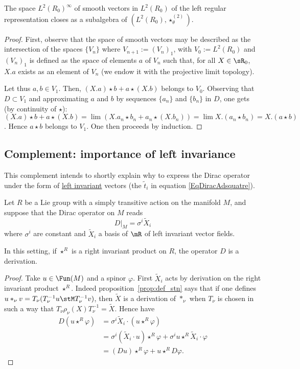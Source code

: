 \begin{proposition}
The space $L^2(R_0)^{\infty}$ of smooth vectors in $L^2(R_0)$ of the left regular representation closes as a subalgebra of $(L^2(R_0),\star^{(2)}_\theta)$.
\end{proposition}

\begin{proof}
First, observe that the space of smooth vectors may be described  as the intersection of the spaces $\{V_n\}$ where  $V_{n+1}:=(V_n)_1$,   with $V_0:=L^2(R_0)$ and $(V_n)_1$ is defined as the space of elements $a$ of $V_n$ such that, for all $X\in\sR_0$, $X.a$ exists as an element of $V_n$ (we endow it with the projective limit topology).                             %

Let thus $a,b\in V_1$. Then, $(X.a)\star b+a\star(X.b)$ belongs to $V_0$.  Observing that $D \subset V_1$ and approximating $a$ and $b$ by sequences $\{a_n\}$ and $\{b_n\}$ in $D $, one gets (by continuity of $\star$): $(X.a)\star b+a\star(X.b)=\lim(X.a_n\star b_n+a_n\star(X.b_n))= \lim X.(a_n\star b_n)=X.(a\star b)$. Hence $a\star b$ belongs to $V_1$.  One then proceeds by induction.
\end{proof}

\subsection{Complement: importance of left invariance}
\label{subsecImpLeftInvarDstar}

This complement intends to shortly explain why to express the Dirac operator under the form of \hyperlink{HyperDefLeftInvar}{left invariant} vectors (the $\tilde t_i$ in equation \eqref{EqDiracAdsquatre}).

Let $R$ be a Lie group with a simply transitive action on the manifold $M$, and suppose that the Dirac operator on $M$ reads
\[
  D|_M=\sigma^i\tilde X_i
\]
where $\sigma^i$ are constant and $\tilde X_i$ a basis of $\mR$ of left invariant vector fields.

\begin{proposition}
In this setting, if $\star^R$ is a right invariant product on $R$, the operator $D$ is a derivation.
\end{proposition}

\begin{proof}
    Take $u\in\Fun(M)$ and a spinor $\varphi$. First $\tilde X_i$ acts by derivation on the right invariant product $\star^R$. Indeed proposition~\ref{prop:def_stn} says that if one defines $u\ast_{\nu} v=T_{\nu}(T_{\nu}^{-1}u\stM T_{\nu}^{-1}v)$, then $\tilde X$ is a derivation of $\ast_{\nu}$ when $T_{\nu}$ is chosen in such a way that $T_{\nu}\rho_{\nu}(X)T_{\nu}^{-1}=\tilde X$. Hence have
\[
\begin{split}
D(u\star^R\varphi)&=\sigma^i\tilde X_i\cdot(u\star^R\varphi)\\
        &=\sigma^i(\tilde X_i\cdot u)\star^R\varphi+\sigma^i u\star^R\tilde X_i\cdot \varphi\\
        &=(Du)\star^R\varphi+u\star^R D\varphi.
\end{split}
\]

\end{proof}

